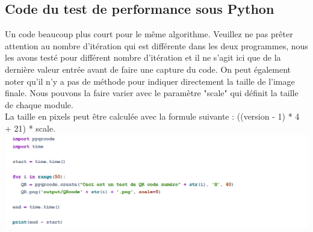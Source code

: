 \documentclass[a4paper,12pt]{article}
\begin{document}
\newpage
\subsection{Code du test de performance sous Python}
Un code beaucoup plus court pour le même algorithme. Veuillez ne pas prêter attention au nombre d'itération qui est différente dans les deux programmes, nous les avons testé pour différent nombre d'itération et il ne s'agit ici que de la dernière valeur entrée avant de faire une capture du code.
On peut également noter qu'il n'y a pas de méthode pour indiquer directement la taille de l'image finale. Nous pouvons la faire varier avec le paramètre "scale" qui définit la taille de chaque module.\\
La taille en pixels peut être calculée avec la formule suivante : ((version - 1) * 4 + 21) * scale.\\

\noindent\includegraphics[width=\textwidth]{code-python.png}
\end{document}
